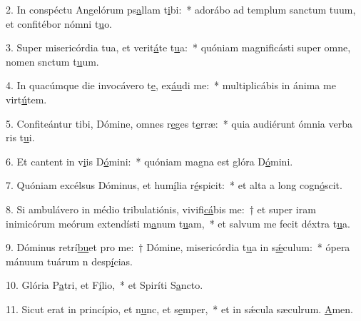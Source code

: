2. In conspéctu Angelórum ps\uline{a}llam t\uline{i}bi:~* adorábo ad templum sanctum tuum, et confitébor nómni t\uline{u}o.\par 
3. Super misericórdia tua, et verit\uline{á}te t\uline{u}a:~* quóniam magnificásti super omne, nomen snctum t\uline{u}um.\par 
4. In quacúmque die invocávero t\uline{e}, ex\uline{áu}di me:~* multiplicábis in ánima me virt\uline{ú}tem.\par 
5. Confiteántur tibi, Dómine, omnes r\uline{e}ges t\uline{e}rræ:~* quia audiérunt ómnia verba ris t\uline{u}i.\par 
6. Et cantent in v\uline{i}is D\uline{ó}mini:~* quóniam magna est glóra D\uline{ó}mini.\par 
7. Quóniam excélsus Dóminus, et hum\uline{í}lia r\uline{é}spicit:~* et alta a long cogn\uline{ó}scit.\par 
8. Si ambulávero in médio tribulatiónis, vivifi\uline{cá}bis me:~† et super iram inimicórum meórum extendísti m\uline{a}num t\uline{u}am,~* et salvum me fecit déxtra t\uline{u}a.\par 
9. Dóminus retrí\uline{bu}et pro me:~† Dómine, misericórdia t\uline{u}a in s\uline{ǽ}culum:~* ópera mánuum tuárum n desp\uline{í}cias.\par 
10. Glória P\uline{a}tri, et F\uline{í}lio,~* et Spiríti S\uline{a}ncto.\par 
11. Sicut erat in princípio, et n\uline{u}nc, et s\uline{e}mper,~* et in sǽcula sæculrum. \uline{A}men.\par 
